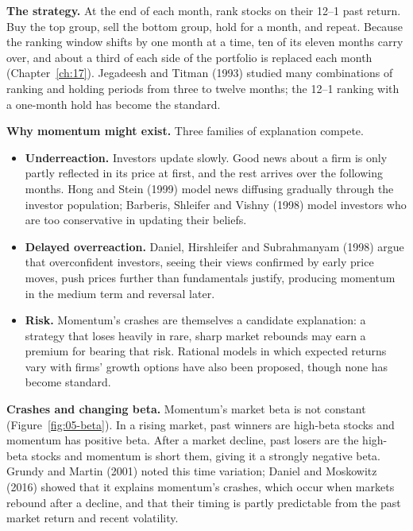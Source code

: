 \textbf{The strategy.} At the end of each month, rank stocks on their 12--1 past return. Buy the top group, sell the bottom group, hold for a month, and repeat. Because the ranking window shifts by one month at a time, ten of its eleven months carry over, and about a third of each side of the portfolio is replaced each month (Chapter~\ref{ch:17}). Jegadeesh and Titman (1993) studied many combinations of ranking and holding periods from three to twelve months; the 12--1 ranking with a one-month hold has become the standard.

\textbf{Why momentum might exist.} Three families of explanation compete.

\begin{itemize}
  \item \textbf{Underreaction.} Investors update slowly. Good news about a firm is only partly reflected in its price at first, and the rest arrives over the following months. Hong and Stein (1999) model news diffusing gradually through the investor population; Barberis, Shleifer and Vishny (1998) model investors who are too conservative in updating their beliefs.
  \item \textbf{Delayed overreaction.} Daniel, Hirshleifer and Subrahmanyam (1998) argue that overconfident investors, seeing their views confirmed by early price moves, push prices further than fundamentals justify, producing momentum in the medium term and reversal later.
  \item \textbf{Risk.} Momentum's crashes are themselves a candidate explanation: a strategy that loses heavily in rare, sharp market rebounds may earn a premium for bearing that risk. Rational models in which expected returns vary with firms' growth options have also been proposed, though none has become standard.
\end{itemize}

\textbf{Crashes and changing beta.} Momentum's market beta is not constant (Figure~\ref{fig:05-beta}). In a rising market, past winners are high-beta stocks and momentum has positive beta. After a market decline, past losers are the high-beta stocks and momentum is short them, giving it a strongly negative beta. Grundy and Martin (2001) noted this time variation; Daniel and Moskowitz (2016) showed that it explains momentum's crashes, which occur when markets rebound after a decline, and that their timing is partly predictable from the past market return and recent volatility.

